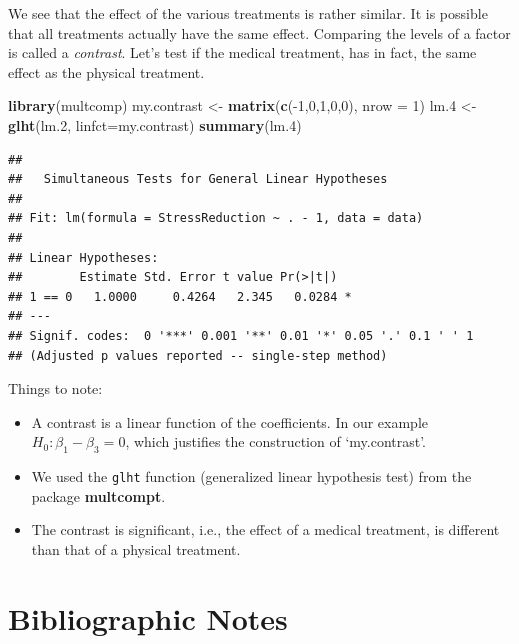 \documentclass[]{book}
\newenvironment{Shaded}{\begin{snugshade}}{\end{snugshade}}
\newcommand{\KeywordTok}[1]{\textcolor[rgb]{0.13,0.29,0.53}{\textbf{{#1}}}}
\newcommand{\DataTypeTok}[1]{\textcolor[rgb]{0.13,0.29,0.53}{{#1}}}
\newcommand{\DecValTok}[1]{\textcolor[rgb]{0.00,0.00,0.81}{{#1}}}
\newcommand{\FloatTok}[1]{\textcolor[rgb]{0.00,0.00,0.81}{{#1}}}
\newcommand{\StringTok}[1]{\textcolor[rgb]{0.31,0.60,0.02}{{#1}}}
\newcommand{\NormalTok}[1]{{#1}}
\providecommand{\tightlist}{%
  \setlength{\itemsep}{0pt}\setlength{\parskip}{0pt}}
\theoremstyle{definition}
\theoremstyle{definition}
\theoremstyle{remark}
\begin{document}
We see that the effect of the various treatments is rather similar. It
is possible that all treatments actually have the same effect. Comparing
the levels of a factor is called a \emph{contrast}. Let's test if the
medical treatment, has in fact, the same effect as the physical
treatment.

\begin{Shaded}
\begin{Highlighting}[]
\KeywordTok{library}\NormalTok{(multcomp)}
\NormalTok{my.contrast <-}\StringTok{ }\KeywordTok{matrix}\NormalTok{(}\KeywordTok{c}\NormalTok{(-}\DecValTok{1}\NormalTok{,}\DecValTok{0}\NormalTok{,}\DecValTok{1}\NormalTok{,}\DecValTok{0}\NormalTok{,}\DecValTok{0}\NormalTok{), }\DataTypeTok{nrow =}  \DecValTok{1}\NormalTok{)}
\NormalTok{lm}\FloatTok{.4} \NormalTok{<-}\StringTok{ }\KeywordTok{glht}\NormalTok{(lm}\FloatTok{.2}\NormalTok{, }\DataTypeTok{linfct=}\NormalTok{my.contrast)}
\KeywordTok{summary}\NormalTok{(lm}\FloatTok{.4}\NormalTok{)}
\end{Highlighting}
\end{Shaded}

\begin{verbatim}
## 
##   Simultaneous Tests for General Linear Hypotheses
## 
## Fit: lm(formula = StressReduction ~ . - 1, data = data)
## 
## Linear Hypotheses:
##        Estimate Std. Error t value Pr(>|t|)  
## 1 == 0   1.0000     0.4264   2.345   0.0284 *
## ---
## Signif. codes:  0 '***' 0.001 '**' 0.01 '*' 0.05 '.' 0.1 ' ' 1
## (Adjusted p values reported -- single-step method)
\end{verbatim}

Things to note:

\begin{itemize}
\tightlist
\item
  A contrast is a linear function of the coefficients. In our example
  \(H_0:\beta_1-\beta_3=0\), which justifies the construction of
  `my.contrast'.
\item
  We used the \texttt{glht} function (generalized linear hypothesis
  test) from the package \textbf{multcompt}.
\item
  The contrast is significant, i.e., the effect of a medical treatment,
  is different than that of a physical treatment.
\end{itemize}

\section{Bibliographic Notes}\label{bibliographic-notes-3}
\end{document}
